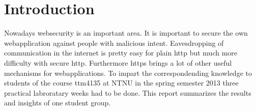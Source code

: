 \section {Introduction}
Nowadays websecurity is an important area. It is important to secure the own webapplication against people with malicious intent.
Eavesdropping of communication in the internet is pretty easy for plain http but much more difficulty with secure http. 
Furthermore https brings a lot of other useful mechanisms for webapplications. 
To impart the correspondending knowledge to students of the course ttm4135 at NTNU in the spring semester 2013 three practical labroratary weeks had to be done.
This report summarizes the results and insights of one student group.
